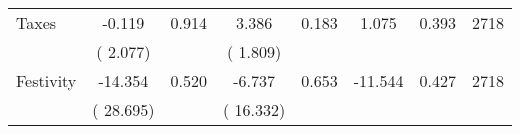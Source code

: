 \begin{tabular}{l*{7}{c}}
 Taxes       &             -0.119       &        0.914  &              3.386       &        0.183  &              1.075       &              0.393 &  2718 \\ 
                       &       (       2.077)             &                               &       (       1.809)                     &                               &                                               &                                &                      \\ 

 Festivity       &            -14.354       &        0.520  &             -6.737       &        0.653  &            -11.544       &              0.427 &  2718 \\ 
                       &       (      28.695)             &                               &       (      16.332)                     &                               &                                               &                                &                      \\ 

\hline \end{tabular}
